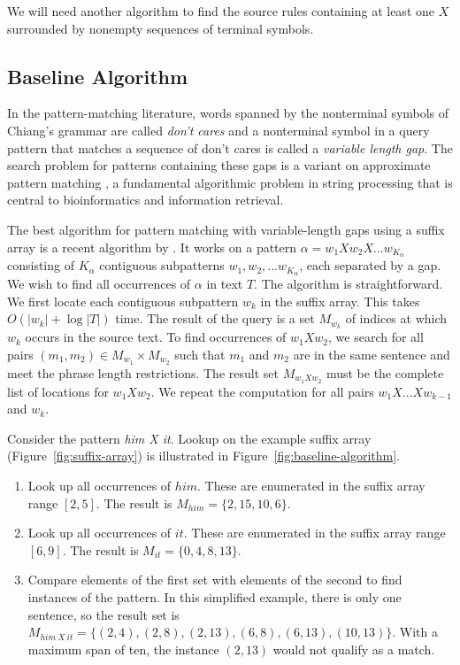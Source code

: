 We will need another algorithm to find the source rules containing
at least one $X$ surrounded by nonempty sequences of terminal symbols.

\subsection{Baseline Algorithm}\label{sec:baseline}

In the pattern-matching literature, words spanned
by the nonterminal symbols of Chiang's grammar are called 
{\em don't cares} and a nonterminal symbol in a query pattern
that matches a sequence of don't cares is
called a {\em variable length gap}.  The search problem for
patterns containing these gaps is a variant on
approximate pattern matching \citep{Navarro:2001:csur}, a fundamental
algorithmic problem in string processing that is central
to bioinformatics and information retrieval.

The best algorithm for
pattern matching with variable-length gaps using a suffix 
array is a recent algorithm by 
\citet[henceforth RILMS]{Rahman:2006:cocoon}.  It works on a pattern
$\alpha = w_1 X w_2 X ... w_{K_\alpha}$ consisting of $K_\alpha$
contiguous subpatterns $w_1, w_2, ... w_{K_\alpha}$, each separated
by a gap.  We wish to find all occurrences of $\alpha$ in text $T$.
The algorithm is straightforward.  We first 
locate each contiguous subpattern $w_k$ in the suffix array.
This takes $O(|w_k| + \log |T|)$ time.  The result of 
the query is a set $M_{w_k}$ of indices at which $w_k$
occurs in the source text.  To find
occurrences of $w_1 X w_2$, we search for all
pairs $(m_1, m_2) \in M_{w_1} \times M_{w_2}$
such that $m_1$ and $m_2$ are in the same sentence
and meet the phrase length restrictions.  
The result set $M_{w_1 X w_2}$ must be 
the complete list of locations for $w_1 X w_2$.  We repeat
the computation for all pairs $w_1 X...X w_{k-1}$ and $w_k$.

Consider the pattern {\em him X it}.  Lookup
on the example suffix array (Figure~\ref{fig:suffix-array}) is 
illustrated in Figure~\ref{fig:baseline-algorithm}.

\begin{enumerate}
	\item Look up all occurrences of $him$.  These are enumerated in the
	suffix array range $[2,5]$.  The result is $M_{him} = \{2, 15, 10, 6\}$.
	\item Look up all occurrences of $it$.  These are enumerated in the suffix
	array range $[6,9]$.  The result is $M_{it} = \{0, 4, 8, 13\}$.
	\item\label{item:compare} Compare elements of the first set with elements
	of the second to find instances of the pattern.  In this simplified example,
	there is only one sentence, so the result set is $M_{him~X~it} = \{(2, 4), (2, 8), (2, 13), (6, 8), (6, 13), (10, 13)\}$.
	With a maximum span of ten, the instance $(2, 13)$ would not qualify as a
	match.
\end{enumerate}

